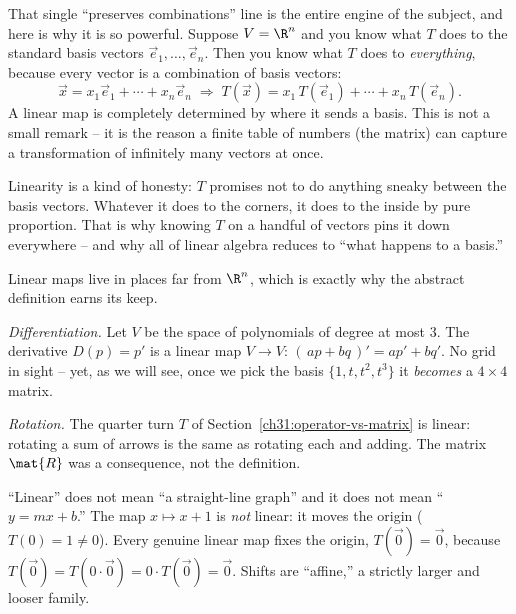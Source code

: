 That single ``preserves combinations'' line is the entire engine of the subject,
and here is why it is so powerful. Suppose $V=\R^n$ and you know what $T$ does to
the standard basis vectors $\vec{e}_1,\dots,\vec{e}_n$. Then you know what $T$
does to \emph{everything}, because every vector is a combination of basis
vectors:
\[
  \vec{x} = x_1\vec{e}_1 + \cdots + x_n\vec{e}_n
  \;\Longrightarrow\;
  T(\vec{x}) = x_1\,T(\vec{e}_1) + \cdots + x_n\,T(\vec{e}_n).
\]
A linear map is completely determined by where it sends a basis. This is not a
small remark -- it is the reason a finite table of numbers (the matrix) can
capture a transformation of infinitely many vectors at once.

\begin{aestheticbox}
Linearity is a kind of honesty: $T$ promises not to do anything sneaky between
the basis vectors. Whatever it does to the corners, it does to the inside by pure
proportion. That is why knowing $T$ on a handful of vectors pins it down
everywhere -- and why all of linear algebra reduces to ``what happens to a
basis.''
\end{aestheticbox}

\begin{example}
\label{ch31:ex-abstract-maps}
Linear maps live in places far from $\R^n$, which is exactly why the abstract
definition earns its keep.

\emph{Differentiation.} Let $V$ be the space of polynomials of degree at most $3$.
The derivative $D(p) = p'$ is a linear map $V\to V$:
$(\,a p + b q\,)' = a p' + b q'$. No grid in sight -- yet, as we will see, once we
pick the basis $\{1,t,t^2,t^3\}$ it \emph{becomes} a $4\times 4$ matrix.

\emph{Rotation.} The quarter turn $T$ of Section~\ref{ch31:operator-vs-matrix} is
linear: rotating a sum of arrows is the same as rotating each and adding. The
matrix $\mat{R}$ was a consequence, not the definition.
\end{example}

\begin{trapbox}
``Linear'' does not mean ``a straight-line graph'' and it does not mean
``$y=mx+b$.'' The map $x\mapsto x+1$ is \emph{not} linear: it moves the origin
($T(0)=1\neq 0$). Every genuine linear map fixes the origin, $T(\vec{0})=\vec{0}$,
because $T(\vec{0})=T(0\cdot\vec{0})=0\cdot T(\vec{0})=\vec{0}$. Shifts are
``affine,'' a strictly larger and looser family.
\end{trapbox}

